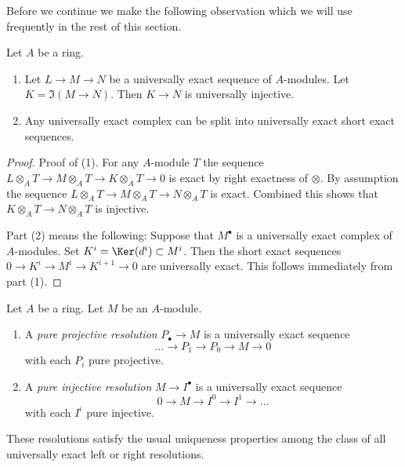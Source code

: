\noindent
Before we continue we make the following observation which we will
use frequently in the rest of this section.

\begin{lemma}
\label{lemma-split-universally-exact-sequence}
Let $A$ be a ring.
\begin{enumerate}
\item Let $L \to M \to N$ be a universally exact sequence
of $A$-modules. Let $K = \Im(M \to N)$.
Then $K \to N$ is universally injective.
\item Any universally exact complex
can be split into universally exact short exact sequences.
\end{enumerate}
\end{lemma}

\begin{proof}
Proof of (1). For any $A$-module $T$ the sequence
$L \otimes_A T \to M \otimes_A T \to K \otimes_A T \to 0$ is exact
by right exactness of $\otimes$. By assumption the sequence
$L \otimes_A T \to M \otimes_A T \to N \otimes_A T$ is exact.
Combined this shows that $K \otimes_A T \to N \otimes_A T$ is injective.

\medskip\noindent
Part (2) means the following: Suppose that $M^\bullet$ is a universally
exact complex of $A$-modules. Set $K^i = \Ker(d^i) \subset M^i$.
Then the short exact sequences $0 \to K^i \to M^i \to K^{i + 1} \to 0$
are universally exact. This follows immediately from part (1).
\end{proof}

\begin{definition}
\label{definition-pure-resolution}
Let $A$ be a ring. Let $M$ be an $A$-module.
\begin{enumerate}
\item A {\it pure projective resolution} $P_\bullet \to M$
is a universally exact sequence
$$
\ldots \to P_1 \to P_0 \to M \to 0
$$
with each $P_i$ pure projective.
\item A {\it pure injective resolution} $M \to I^\bullet$ is a universally
exact sequence
$$
0 \to M \to I^0 \to I^1 \to \ldots
$$
with each $I^i$ pure injective.
\end{enumerate}
\end{definition}

\noindent
These resolutions satisfy the usual uniqueness properties among the class
of all universally exact left or right resolutions.

